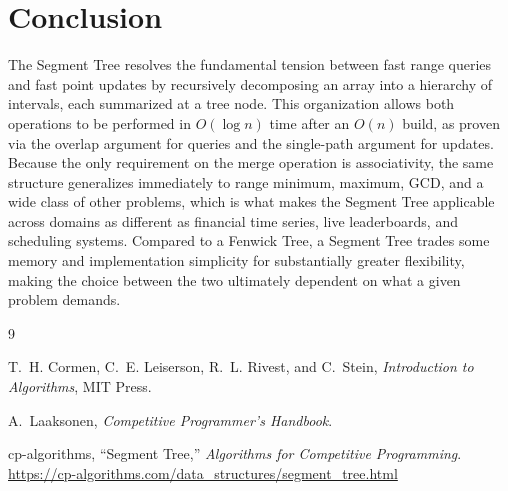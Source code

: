 \documentclass[11pt]{scrartcl}
\begin{document}
\section{Conclusion}

The Segment Tree resolves the fundamental tension between fast range queries and fast point updates by recursively decomposing an array into a hierarchy of intervals, each summarized at a tree node. This organization allows both operations to be performed in $O(\log n)$ time after an $O(n)$ build, as proven via the overlap argument for queries and the single-path argument for updates. Because the only requirement on the merge operation is associativity, the same structure generalizes immediately to range minimum, maximum, GCD, and a wide class of other problems, which is what makes the Segment Tree applicable across domains as different as financial time series, live leaderboards, and scheduling systems. Compared to a Fenwick Tree, a Segment Tree trades some memory and implementation simplicity for substantially greater flexibility, making the choice between the two ultimately dependent on what a given problem demands.

\begin{thebibliography}{9}

T.~H. Cormen, C.~E. Leiserson, R.~L. Rivest, and C.~Stein, \textit{Introduction to Algorithms}, MIT Press.

A.~Laaksonen, \textit{Competitive Programmer's Handbook}.

cp-algorithms, ``Segment Tree,'' \textit{Algorithms for Competitive Programming}. \url{https://cp-algorithms.com/data_structures/segment_tree.html}

\end{thebibliography}
\end{document}
